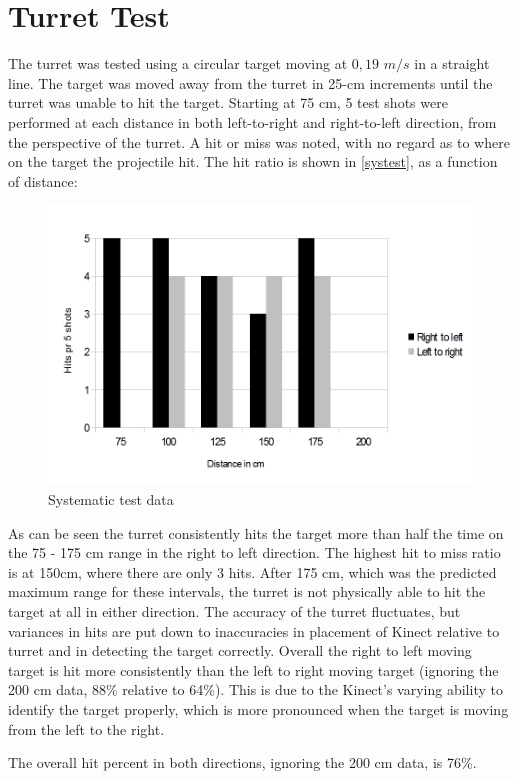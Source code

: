 \section{Turret Test}
The turret was tested using a circular target moving at $0,19$ $m/s$ in a straight line. 
The target was moved away from the turret in 25-cm increments until the turret was unable to hit the target. Starting at 75 cm, 5 test shots were performed at each distance in both left-to-right and right-to-left direction, from the perspective of the turret. A hit or miss was noted, with no regard as to where on the target the projectile hit. The hit ratio is shown in \autoref{systest}, as a function of distance:

\begin{figure}[hbtp]
	\includegraphics[scale=0.5]{img/test.png}
	\caption{Systematic test data}
	\label{systest}
\end{figure}

As can be seen the turret consistently hits the target more than half the time on the 75 - 175 cm range in the right to left direction. The highest hit to miss ratio is at 150cm, where there are only 3 hits. After 175 cm, which was the predicted maximum range for these intervals, the turret is not physically able to hit the target at all in either direction. The accuracy of the turret fluctuates, but variances in hits are put down to inaccuracies in placement of Kinect relative to turret and in detecting the target correctly. Overall the right to left moving target is hit more consistently than the left to right moving target (ignoring the 200 cm data, 88\% relative to 64\%). This is due to the Kinect's varying ability to identify the target properly, which is more pronounced when the target is moving from the left to the right.

The overall hit percent in both directions, ignoring the 200 cm data, is 76\%.
